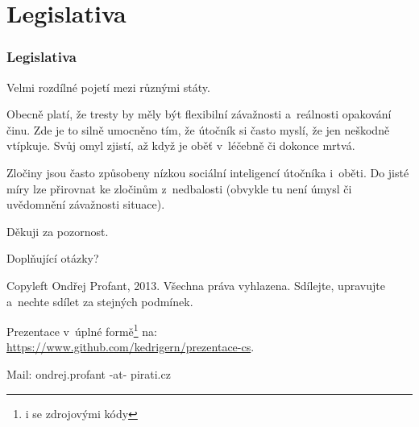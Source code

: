 \documentclass[xetex]{beamer}
\begin{document}
\section{Legislativa}
\begin{frame}
	\frametitle{Legislativa}

	Velmi rozdílné pojetí mezi různými státy.

	\bigskip

	Obecně platí, že tresty by měly být flexibilní závažnosti a~reálnosti opakování činu. 
	Zde je to silně umocněno tím, že útočník si často myslí, že jen neškodně vtípkuje. 
	Svůj omyl zjistí, až když je oběť v~léčebně či dokonce mrtvá.

	\bigskip

	Zločiny jsou často způsobeny nízkou sociální inteligencí útočníka i~oběti.
	Do jisté míry lze přirovnat ke zločinům z~nedbalosti 
	(obvykle tu není úmysl či uvědomnění závažnosti situace).
\end{frame}

\begin{frame}

	Děkuji za pozornost.

	\bigskip
	
	Doplňující otázky?

	\bigskip

	\bigskip

	\scriptsize
	Copyleft Ondřej Profant, 2013. Všechna práva vyhlazena. Sdílejte, upravujte a~nechte sdílet za stejných podmínek. 

	\bigskip

	Prezentace v~úplné formě\footnote{i se zdrojovými kódy} na:\\ 
	\url{https://www.github.com/kedrigern/prezentace-cs}.

	\bigskip

	Mail: ondrej.profant -at- pirati.cz 
\end{frame}
\end{document}
